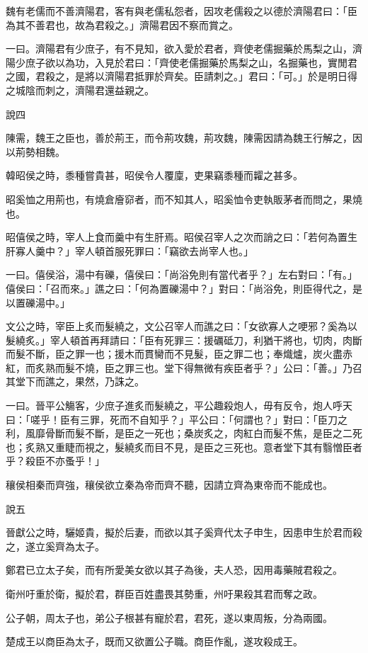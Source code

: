\begin{pinyinscope}
魏有老儒而不善濟陽君，客有與老儒私怨者，因攻老儒殺之以德於濟陽君曰：「臣為其不善君也，故為君殺之。」濟陽君因不察而賞之。

一曰。濟陽君有少庶子，有不見知，欲入愛於君者，齊使老儒掘藥於馬梨之山，濟陽少庶子欲以為功，入見於君曰：「齊使老儒掘藥於馬梨之山，名掘藥也，實閒君之國，君殺之，是將以濟陽君抵罪於齊矣。臣請刺之。」君曰：「可。」於是明日得之城陰而刺之，濟陽君還益親之。

說四

陳需，魏王之臣也，善於荊王，而令荊攻魏，荊攻魏，陳需因請為魏王行解之，因以荊勢相魏。

韓昭侯之時，黍種嘗貴甚，昭侯令人覆廩，吏果竊黍種而糶之甚多。

昭奚恤之用荊也，有燒倉廥窌者，而不知其人，昭奚恤令吏執販茅者而問之，果燒也。

昭僖侯之時，宰人上食而羹中有生肝焉。昭侯召宰人之次而誚之曰：「若何為置生肝寡人羹中？」宰人頓首服死罪曰：「竊欲去尚宰人也。」

一曰。僖侯浴，湯中有礫，僖侯曰：「尚浴免則有當代者乎？」左右對曰：「有。」僖侯曰：「召而來。」譙之曰：「何為置礫湯中？」對曰：「尚浴免，則臣得代之，是以置礫湯中。」

文公之時，宰臣上炙而髮繞之，文公召宰人而譙之曰：「女欲寡人之哽邪？奚為以髮繞炙。」宰人頓首再拜請曰：「臣有死罪三：援礪砥刀，利猶干將也，切肉，肉斷而髮不斷，臣之罪一也；援木而貫臠而不見髮，臣之罪二也；奉熾爐，炭火盡赤紅，而炙熟而髮不燒，臣之罪三也。堂下得無微有疾臣者乎？」公曰：「善。」乃召其堂下而譙之，果然，乃誅之。

一曰。晉平公觴客，少庶子進炙而髮繞之，平公趣殺炮人，毋有反令，炮人呼天曰：「嗟乎！臣有三罪，死而不自知乎？」平公曰：「何謂也？」對曰：「臣刀之利，風靡骨斷而髮不斷，是臣之一死也；桑炭炙之，肉紅白而髮不焦，是臣之二死也；炙熟又重睫而視之，髮繞炙而目不見，是臣之三死也。意者堂下其有翳憎臣者乎？殺臣不亦蚤乎！」

穰侯相秦而齊強，穰侯欲立秦為帝而齊不聽，因請立齊為東帝而不能成也。

說五

晉獻公之時，驪姬貴，擬於后妻，而欲以其子奚齊代太子申生，因患申生於君而殺之，遂立奚齊為太子。

鄭君已立太子矣，而有所愛美女欲以其子為後，夫人恐，因用毒藥賊君殺之。

衛州吁重於衛，擬於君，群臣百姓盡畏其勢重，州吁果殺其君而奪之政。

公子朝，周太子也，弟公子根甚有寵於君，君死，遂以東周叛，分為兩國。

楚成王以商臣為太子，既而又欲置公子職。商臣作亂，遂攻殺成王。


\end{pinyinscope}
